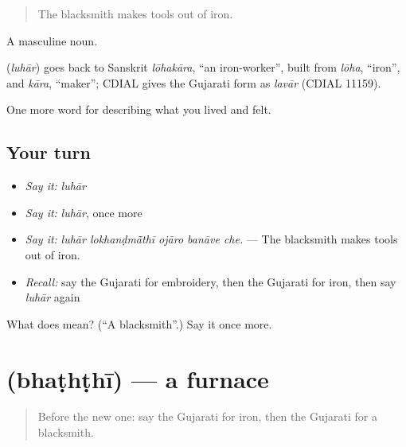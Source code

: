 \begin{quote}
The blacksmith makes tools out of iron.
\end{quote}

A masculine noun.

\begin{cousinweb}
\textbf{} (\emph{luhār}) goes back to Sanskrit \emph{lōhakāra}, \textquotedblleft{}an iron-worker\textquotedblright{}, built from \emph{lōha}, \textquotedblleft{}iron\textquotedblright{}, and \emph{kāra}, \textquotedblleft{}maker\textquotedblright{}; CDIAL gives the Gujarati form as \emph{lavār} (CDIAL 11159).
\end{cousinweb}

\begin{grammarlens}[title={What you've built}]
One more word for describing what you lived and felt.
\end{grammarlens}

\subsection*{Your turn}
\begin{itemize}
\raggedright
  \item \emph{Say it:} \emph{luhār}
  \item \emph{Say it:} \emph{luhār}, once more
  \item \emph{Say it:} \emph{luhār lokhanḍmā̃thī ojāro banāve che.} — The blacksmith makes tools out of iron.
  \item \emph{Recall:} say the Gujarati for embroidery, then the Gujarati for iron, then say \emph{luhār} again
\end{itemize}

\begin{tcolorbox}[breakable,colback=teal!4,colframe=teal!35!black,title={Before you move on}]
What does  mean? (\textquotedblleft{}A blacksmith\textquotedblright{}.) Say it once more.
\end{tcolorbox}
\section[\texorpdfstring{\gu{ભઠ્ઠી} (bhaṭhṭhī)}{ભઠ્ઠી (bhaṭhṭhī)}]{ (bhaṭhṭhī) — a furnace}

\label{lesson:GU-C508-bhaththi}



\begin{quote}
Before the new one: say the Gujarati for iron, then the Gujarati for a blacksmith.
\end{quote}

